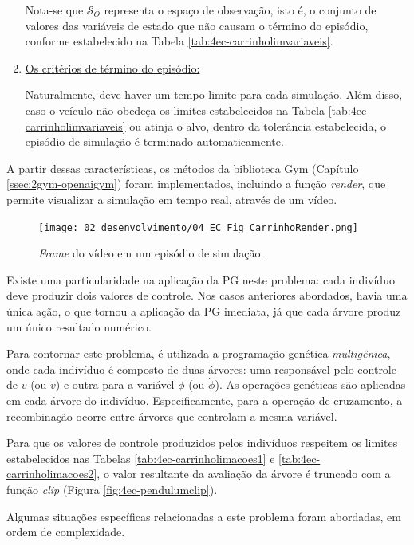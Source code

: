 \begin{enumerate}[label=\alph*)]
	Nota-se que $\mathcal{S}_O$ representa o espaço de observação, isto é, o conjunto de valores das variáveis de estado que não causam o término do episódio, conforme estabelecido na Tabela \ref{tab:4ec-carrinholimvariaveis}.
	
	\item \underline{Os critérios de término do episódio:}
	
	Naturalmente, deve haver um tempo limite para cada simulação. Além disso, caso o veículo não obedeça os limites estabelecidos na Tabela \ref{tab:4ec-carrinholimvariaveis} ou atinja o alvo, dentro da tolerância estabelecida, o episódio de simulação é terminado automaticamente. 
	
\end{enumerate}

A partir dessas características, os métodos da biblioteca Gym (Capítulo \ref{ssec:2gym-openaigym}) foram implementados, incluindo a função \textit{render}, que permite visualizar a simulação em tempo real, através de um vídeo.

\begin{figure}[H]
	\centering
	\texttt{[image: 02\_desenvolvimento/04\_EC\_Fig\_CarrinhoRender.png]}
	\caption{\textit{Frame} do vídeo em um episódio de simulação.}
	\label{fig:4ec-carrinhorender}
\end{figure}

Existe uma particularidade na aplicação da PG neste problema: cada indivíduo deve produzir dois valores de controle. Nos casos anteriores abordados, havia uma única ação, o que tornou a aplicação da PG imediata, já que cada árvore produz um único resultado numérico.

Para contornar este problema, é utilizada a programação genética \textit{multigênica}, onde cada indivíduo é composto de duas árvores: uma responsável pelo controle de $v$ (ou $\dot{v}$) e outra para a variável $\phi$ (ou $\dot{\phi}$). As operações genéticas são aplicadas em cada árvore do indivíduo. Especificamente, para a operação de cruzamento, a recombinação ocorre entre árvores que controlam a mesma variável.

Para que os valores de controle produzidos pelos indivíduos respeitem os limites estabelecidos nas Tabelas \ref{tab:4ec-carrinholimacoes1} e \ref{tab:4ec-carrinholimacoes2}, o valor resultante da avaliação da árvore é truncado com a função \textit{clip} (Figura \ref{fig:4ec-pendulumclip}).

Algumas situações específicas relacionadas a este problema foram abordadas, em ordem de complexidade.

